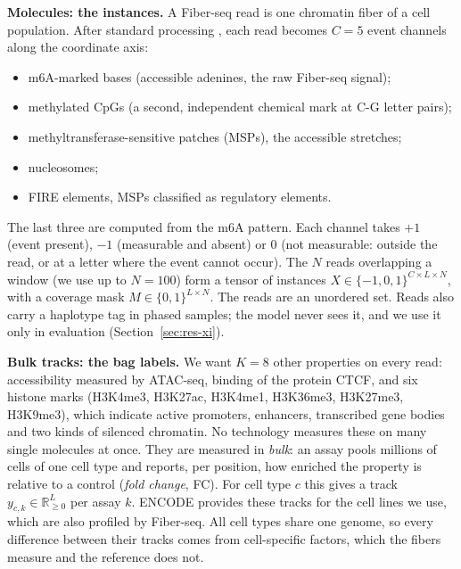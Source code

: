 \documentclass[acmtog,nonacm]{acmart}   %
\begin{document}
\textbf{Molecules: the instances.} A Fiber-seq read is one chromatin fiber of a cell population. After standard
processing \citep{Jha24}, each read becomes $C=5$ event channels along the coordinate axis:
\begin{itemize}
  \item m6A-marked bases (accessible adenines, the raw Fiber-seq signal);
  \item methylated CpGs (a second, independent chemical mark at C-G letter pairs);
  \item methyltransferase-sensitive patches (MSPs), the accessible stretches;
  \item nucleosomes;
  \item FIRE elements, MSPs classified as regulatory elements.
\end{itemize}
The last three are computed from the m6A pattern. Each channel takes $+1$ (event present), $-1$ (measurable and
absent) or $0$ (not measurable: outside the read, or at a letter where the event cannot occur). The $N$ reads
overlapping a window (we use up to $N=100$) form a tensor of instances $X\in\{-1,0,1\}^{C\times L\times N}$, with a
coverage mask $M\in\{0,1\}^{L\times N}$. The reads are an unordered set. Reads also carry a haplotype tag in phased
samples; the model never sees it, and we use it only in evaluation (Section~\ref{sec:res-xi}).

\textbf{Bulk tracks: the bag labels.} We want $K=8$ other properties on every read: accessibility measured by
ATAC-seq, binding of the protein CTCF, and six histone marks (H3K4me3, H3K27ac, H3K4me1, H3K36me3, H3K27me3,
H3K9me3), which indicate active promoters, enhancers, transcribed gene bodies and two kinds of silenced chromatin.
No technology measures these on many single molecules at once. They are measured in \emph{bulk}: an assay pools
millions of cells of one cell type and reports, per position, how enriched the property is relative to a control
(\emph{fold change}, FC). For cell type $c$ this gives a track $y_{c,k}\in\mathbb{R}_{\ge0}^{L}$ per assay $k$.
ENCODE \citep{ENCODE20} provides these tracks for the cell lines we use, which are also profiled by Fiber-seq. All
cell types share one genome, so every difference between their tracks comes from cell-specific factors, which the
fibers measure and the reference does not.
\end{document}
